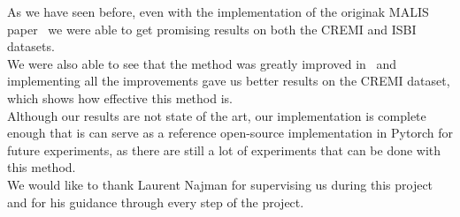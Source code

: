 
As we have seen before, even with the implementation of the originak MALIS
paper~\cite{turaga_maximin_2009} we were able to get promising results on both
the CREMI and ISBI datasets. \\
We were also able to see that the method was greatly improved
in~\cite{funke_large_2019} and implementing all the improvements gave us
better results on the CREMI dataset, which shows how effective this method
is.\\
Although our results are not state of the art, our implementation is complete
enough that is can serve as a reference open-source implementation in Pytorch
for future experiments, as there are still a lot of experiments that can be
done with this method.\\

We would like to thank Laurent Najman for supervising us during this project
and for his guidance through every step of the project.
